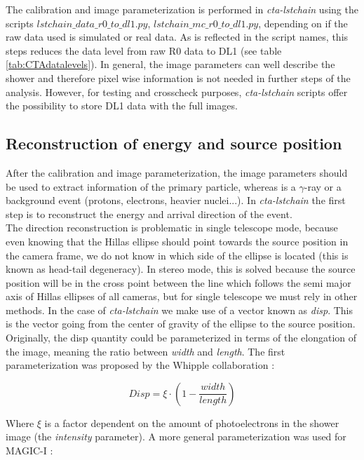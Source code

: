 \documentclass[main.tex]{subfiles}
\begin{document}
The calibration and image parameterization is performed in \textit{cta-lstchain} using the scripts \textit{$lstchain\_data\_r0\_to\_dl1.py$}, \textit{$lstchain\_mc\_r0\_to\_dl1.py$}, depending on if the raw data used is simulated or real data. As is reflected in the script names, this steps reduces the data level from raw R0 data to DL1 (see table \ref{tab:CTAdatalevels}). In general, the image parameters can well describe the shower and therefore pixel wise information is not needed in further steps of the analysis. However, for testing and crosscheck purposes, \textit{cta-lstchain} scripts offer the possibility to store DL1 data with the full images.


\subsection{Reconstruction of energy and source position}

After the calibration and image parameterization, the image parameters should be used to extract information of the primary particle, whereas is a $\gamma$-ray or a background event (protons, electrons, heavier nuclei...). In \textit{cta-lstchain} the first step is to reconstruct the energy and arrival direction of the event.\\ 
The direction reconstruction is problematic in single telescope mode, because even knowing that the Hillas ellipse should point towards the source position in the camera frame, we do not know in which side of the ellipse is located (this is known as head-tail degeneracy). In stereo mode, this is solved because the source position will be in the cross point between the line which follows the semi major axis of Hillas ellipses of all cameras, but for single telescope we must rely in other methods. In the case of \textit{cta-lstchain} we make use of a vector known as \textit{disp}. This is the vector going from the center of gravity of the ellipse to the source position.\\
Originally, the disp quantity could be parameterized in terms of the elongation of the image, meaning the ratio between \textit{width} and \textit{length}. The first parameterization was proposed by the Whipple collaboration \cite{1994dispwhipple}:

\begin{equation}
  Disp = \xi \cdot \left(1 - \frac{width}{length}  \right)
\end{equation}

Where $\xi$ is a factor dependent on the amount of photoelectrons in the shower image (the \textit{intensity} parameter). A more general parameterization was used for MAGIC-I \cite{2005DISPmagic}:
\end{document}
